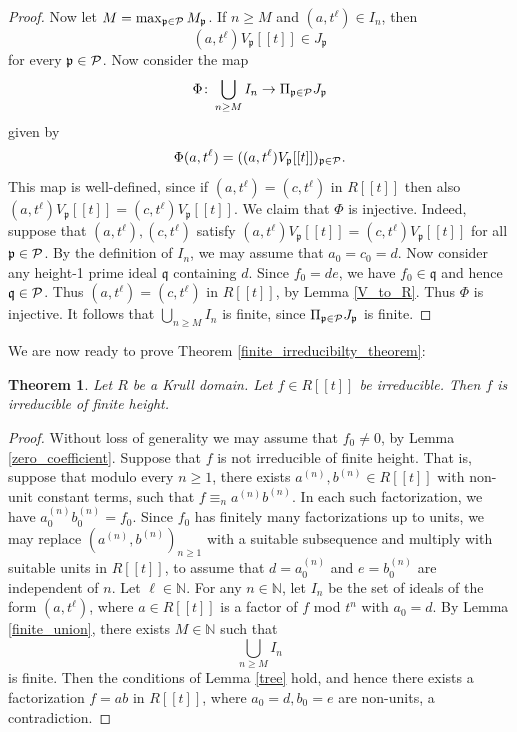 \documentclass{article}
\newcommand{\N}{\mathbb{N}}
\newcommand{\frp}{\mathfrak{p}}
\newcommand{\frqqq}{\mathfrak{q}}
\theoremstyle{plain}
\newtheorem{theorem}{Theorem}[section]
\theoremstyle{definition}
\theoremstyle{remark}
\theoremstyle{plain}
\begin{document}
\begin{proof}
Now let $M = \max_{\frp \in {\cal{P}}} M_\frp$. If $n \geq M$ and $(a,t^\ell) \in I_{n}$, then $$(a,t^\ell)V_\frp[[t]] \in J_\frp$$
for every $\frp \in {\cal{P}}$. Now consider the map $$\Phi \colon \bigcup_{n \geq M} I_n \to \Pi_{\frp \in {\cal{P}}} J_\frp$$ given by $$\Phi(a,t^\ell) = ((a,t^\ell)V_\frp[[t]])_{\frp \in {\cal{P}}}.$$
This map is well-defined, since if $(a,t^\ell) = (c,t^\ell)$ in $R[[t]]$ then also $(a,t^\ell)V_\frp[[t]] = (c,t^\ell)V_\frp[[t]]$. We claim that $\Phi$ is injective. Indeed, suppose that $(a,t^\ell),(c,t^\ell)$ satisfy $(a,t^\ell)V_\frp[[t]] = (c,t^\ell)V_\frp[[t]]$ for all $\frp \in {\cal{P}}$. By the definition of $I_n$, we may assume that $a_0= c_0 = d.$ Now consider any height-1 prime ideal $\frqqq$ containing $d$. Since $f_0 = de$, we have $f_0 \in \frqqq$ and hence $\frqqq \in {\cal{P}}$. Thus $(a,t^\ell) = (c,t^\ell)$ in $R[[t]]$, by Lemma \ref{V_to_R}.  Thus $\Phi$ is injective. It follows that $\bigcup_{n \geq M} I_n$ is finite, since $\Pi_{\frp \in {\cal{P}}} J_\frp$ is finite. 
\end{proof}

We are now ready to prove Theorem \ref{finite_irreducibilty_theorem}:

\begin{theorem}\label{finite_irreducibility_section}
    Let $R$ be a Krull domain. Let $f \in R[[t]]$ be irreducible. Then $f$ is irreducible of finite height. 
\end{theorem}
\begin{proof}
Without loss of generality we may assume that $f_0 \neq 0$, by Lemma \ref{zero_coefficient}. Suppose that $f$ is not irreducible of finite height. That is, suppose that modulo every $n \geq 1$, there exists $a^{(n)},b^{(n)} \in R[[t]]$ with non-unit constant terms, such that $f \equiv_n a^{(n)}b^{(n)}$. In each such factorization, we have $a^{(n)}_0b^{(n)}_0 = f_0$. Since $f_0$ has finitely many factorizations up to units, we may replace $(a^{(n)},b^{(n)})_{n \geq 1}$ with a suitable subsequence and multiply with suitable units in $R[[t]]$, to assume that $d = a^{(n)}_0$ and $e = b^{(n)}_0$ are independent of $n$. Let $\ell \in \N$. For any $n \in \N$, let $I_n$ be the set of ideals of the form $(a,t^\ell)$, where $a \in R[[t]]$ is a factor of $f$ mod $t^n$ with $a_0 = d$. By Lemma \ref{finite_union}, there exists $M \in \N$ such that 
    $$\bigcup_{n \geq M} I_n$$ is finite. Then the conditions of Lemma \ref{tree} hold, and hence there exists a factorization $f = ab$ in $R[[t]]$, where $a_0 = d,b_0 = e$ are non-units, a contradiction. 

\end{proof}
\end{document}
